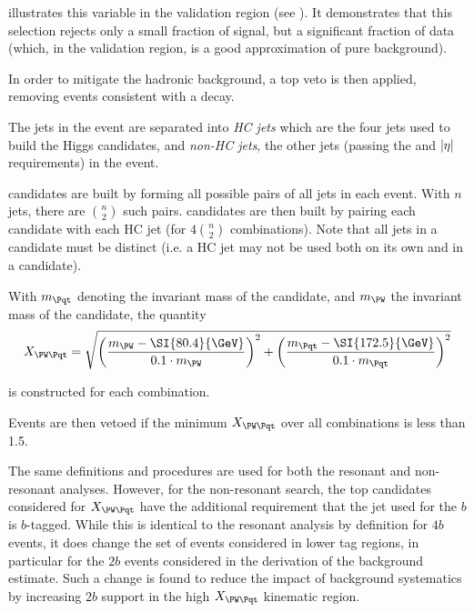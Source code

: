 \Fig{\ref{fig:deta-hh-plots}} illustrates this variable in the validation region
(see \Sect{\ref{sec:kin-reg-def}}). It demonstrates that this selection rejects
only a small fraction of signal, but a significant fraction of data (which, in
the validation region, is a good approximation of pure background).


In order to mitigate the hadronic \ttbar background, a top veto is then applied,
removing events consistent with a 
decay.

The jets in the event are separated into \emph{HC jets} which are
the four jets used to build the Higgs candidates, and \emph{non-HC jets}, the
other jets (passing the \pt and $\abs{\eta}$ requirements) in the event.

\PW candidates are built by forming all possible pairs of all jets in each event.
With $n$ jets, there are $\binom{n}{2}$ such pairs. \Pqt candidates are then built
by pairing each \PW candidate with each HC jet (for $4\binom{n}{2}$ combinations).
Note that all jets in a \Pqt candidate must be distinct (i.e. a HC jet may not be
used both on its own and in a \PW candidate).

With $m_{\Pqt}$ denoting the invariant mass of the \Pqt candidate, and $m_{\PW}$
the invariant mass of the \PW candidate, the quantity
\begin{equation}
	\label{eqn:xwt-def}
	X_{\PW\Pqt} = \sqrt{\qty(\frac{m_{\PW} - \SI{80.4}{\GeV}}{0.1\cdot m_{\PW}})^{2} + \qty(\frac{m_{\Pqt} - \SI{172.5}{\GeV}}{0.1\cdot m_{\Pqt}})^{2}}
\end{equation}

is constructed for each combination.

Events are then vetoed if the minimum $X_{\PW\Pqt}$ over all combinations is
less than 1.5.

The same definitions and procedures are used for both the resonant and non-resonant analyses.
However, for the non-resonant search, the top candidates considered for $X_{\PW\Pqt}$ have the 
additional requirement that the jet used for the $b$ is $b$-tagged. While this is identical
to the resonant analysis by definition for $4b$ events, it does change the set of events 
considered in lower tag regions, in particular for the $2b$ events considered in the derivation
of the background estimate. Such a change is found to reduce the impact of background systematics
by increasing $2b$ support in the high $X_{\PW\Pqt}$ kinematic region. 

